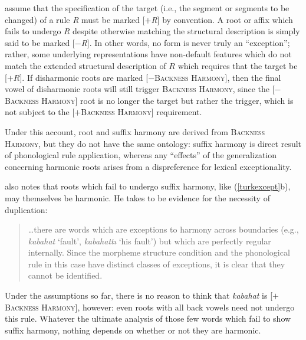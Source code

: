 \citeauthor{SPE} assume that the specification of the target (i.e., the segment or segments to be changed) of a rule \emph{R} must be marked [$+$\emph{R}] by convention. A root or affix which fails to undergo \emph{R} despite otherwise matching the structural description is simply said to be marked [$-$\emph{R}]. In other words, no form is never truly an ``exception''; rather, some underlying representations have non-default features which do not match the extended structural description of $R$ which requires that the target be [$+R$]. If disharmonic roots are marked [$-$\textsc{Backness Harmony}], then the final vowel of disharmonic roots will still trigger \textsc{Backness Harmony}, since the [$-$\textsc{Backness Harmony}] root is no longer the target but rather the trigger, which is not subject to the [$+$\textsc{Backness Harmony}] requirement.

Under this account, root and suffix harmony are derived from \textsc{Backness Harmony}, but they do not have the same ontology: suffix harmony is direct result of phonological rule application, whereas any ``effects'' of the  generalization concerning harmonic roots arises from a dispreference for lexical exceptionality.

\citeauthor{A74} also notes that roots which fail to undergo suffix harmony, like (\ref{turkexcept}b), may themselves be harmonic. He takes to be evidence for the necessity of duplication:

\begin{quote}
\ldots{}there are words which are exceptions to harmony across boundaries (e.g., \emph{kabahat} `fault', \emph{kabahattı} `his fault') but which are perfectly regular internally. Since the morpheme structure condition and the phonological rule in this case have distinct classes of exceptions, it is clear that they cannot be identified. \citep[289]{A74}
\end{quote}

\noindent
Under the assumptions so far, there is no reason to think that \emph{kabahat} is [$+$\textsc{Backness Harmony}], however: even roots with all back vowels need not undergo this rule. Whatever the ultimate analysis of those few words which fail to show suffix harmony, nothing depends on whether or not they are harmonic.


